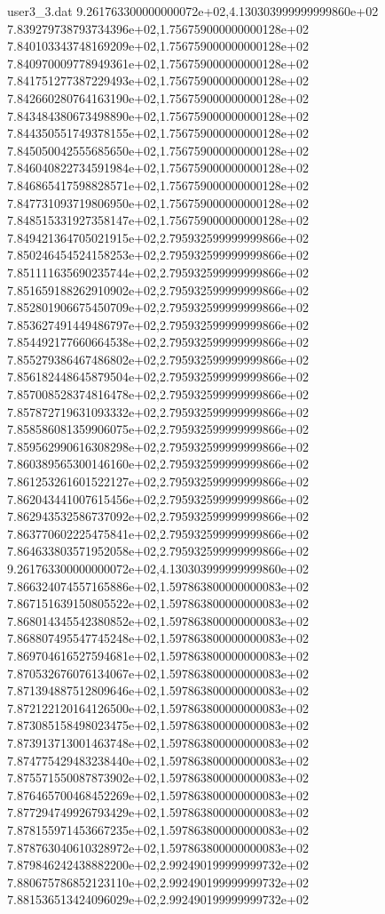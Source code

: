\begin{filecontents}{user3_3.dat}
9.261763300000000072e+02,4.130303999999999860e+02
7.839279738793734396e+02,1.756759000000000128e+02
7.840103343748169209e+02,1.756759000000000128e+02
7.840970009778949361e+02,1.756759000000000128e+02
7.841751277387229493e+02,1.756759000000000128e+02
7.842660280764163190e+02,1.756759000000000128e+02
7.843484380673498890e+02,1.756759000000000128e+02
7.844350551749378155e+02,1.756759000000000128e+02
7.845050042555685650e+02,1.756759000000000128e+02
7.846040822734591984e+02,1.756759000000000128e+02
7.846865417598828571e+02,1.756759000000000128e+02
7.847731093719806950e+02,1.756759000000000128e+02
7.848515331927358147e+02,1.756759000000000128e+02
7.849421364705021915e+02,2.795932599999999866e+02
7.850246454524158253e+02,2.795932599999999866e+02
7.851111635690235744e+02,2.795932599999999866e+02
7.851659188262910902e+02,2.795932599999999866e+02
7.852801906675450709e+02,2.795932599999999866e+02
7.853627491449486797e+02,2.795932599999999866e+02
7.854492177660664538e+02,2.795932599999999866e+02
7.855279386467486802e+02,2.795932599999999866e+02
7.856182448645879504e+02,2.795932599999999866e+02
7.857008528374816478e+02,2.795932599999999866e+02
7.857872719631093332e+02,2.795932599999999866e+02
7.858586081359906075e+02,2.795932599999999866e+02
7.859562990616308298e+02,2.795932599999999866e+02
7.860389565300146160e+02,2.795932599999999866e+02
7.861253261601522127e+02,2.795932599999999866e+02
7.862043441007615456e+02,2.795932599999999866e+02
7.862943532586737092e+02,2.795932599999999866e+02
7.863770602225475841e+02,2.795932599999999866e+02
7.864633803571952058e+02,2.795932599999999866e+02
9.261763300000000072e+02,4.130303999999999860e+02
7.866324074557165886e+02,1.597863800000000083e+02
7.867151639150805522e+02,1.597863800000000083e+02
7.868014345542380852e+02,1.597863800000000083e+02
7.868807495547745248e+02,1.597863800000000083e+02
7.869704616527594681e+02,1.597863800000000083e+02
7.870532676076134067e+02,1.597863800000000083e+02
7.871394887512809646e+02,1.597863800000000083e+02
7.872122120164126500e+02,1.597863800000000083e+02
7.873085158498023475e+02,1.597863800000000083e+02
7.873913713001463748e+02,1.597863800000000083e+02
7.874775429483238440e+02,1.597863800000000083e+02
7.875571550087873902e+02,1.597863800000000083e+02
7.876465700468452269e+02,1.597863800000000083e+02
7.877294749926793429e+02,1.597863800000000083e+02
7.878155971453667235e+02,1.597863800000000083e+02
7.878763040610328972e+02,1.597863800000000083e+02
7.879846242438882200e+02,2.992490199999999732e+02
7.880675786852123110e+02,2.992490199999999732e+02
7.881536513424096029e+02,2.992490199999999732e+02

\end{filecontents}
